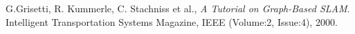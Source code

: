 \documentclass[twoside]{article}
\begin{document}
\begin{multicols}{2}

\begin{thebibliography}{2} %

G.Grisetti, R. Kummerle, C. Stachniss et al., \emph{A Tutorial on Graph-Based SLAM}. Intelligent Transportation Systems Magazine, IEEE (Volume:2, Issue:4), 2000.
%
%

\end{thebibliography}


\end{multicols}
\end{document}
